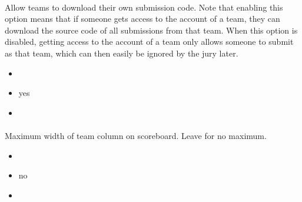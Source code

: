\documentclass[a4paper,10pt,english,openany]{sphinxmanual}
\begin{document}
\paragraph{}
\label{\detokenize{configuration-reference:allow-team-submission-download}}
\sphinxAtStartPar
Allow teams to download their own submission code. Note that enabling this option means that if someone gets access to the account of a team, they can download
the source code of all submissions from that team. When this option is disabled, getting access to the account
of a team only allows someone to submit as that team, which can then easily be ignored by the jury later.
\begin{itemize}
\item {} 
\sphinxAtStartPar
{} 

\item {} 
\sphinxAtStartPar
{} yes

\item {} 
\sphinxAtStartPar
{} 

\end{itemize}


\paragraph{}
\label{\detokenize{configuration-reference:team-column-width}}
\sphinxAtStartPar
Maximum width of team column on scoreboard. Leave  for no maximum.
\begin{itemize}
\item {} 
\sphinxAtStartPar
{} 

\item {} 
\sphinxAtStartPar
{} no

\item {} 
\sphinxAtStartPar
{} 

\end{itemize}
\end{document}
